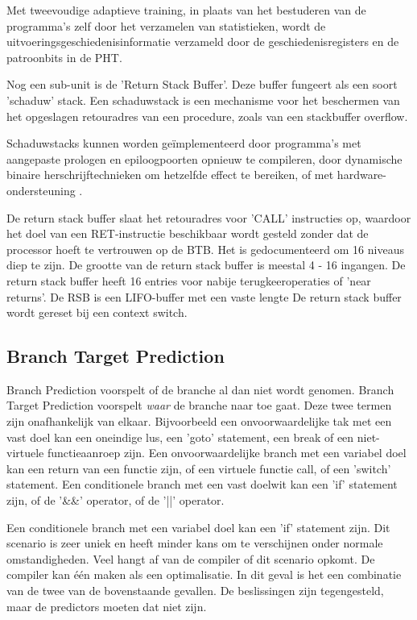 Met tweevoudige adaptieve training, in plaats van het bestuderen van de programma's zelf door het verzamelen van statistieken, wordt de uitvoeringsgeschiedenisinformatie verzameld door de geschiedenisregisters en de patroonbits in de PHT.

Nog een sub-unit is de 'Return Stack Buffer'. Deze buffer fungeert als een soort 'schaduw' stack.
Een schaduwstack is een mechanisme voor het beschermen van het opgeslagen retouradres van een procedure, zoals van een stackbuffer overflow.

Schaduwstacks kunnen worden geïmplementeerd door programma's met aangepaste prologen en epiloogpoorten opnieuw te compileren, door dynamische binaire herschrijftechnieken om hetzelfde effect te bereiken, of met hardware-ondersteuning \parencite{Sinnadurai2008}.

De return stack buffer slaat het retouradres voor 'CALL' instructies op, waardoor het doel van een RET-instructie beschikbaar wordt gesteld zonder dat de processor hoeft te vertrouwen op de BTB. Het is gedocumenteerd om 16 niveaus diep te zijn.
De grootte van de return stack buffer is meestal 4 - 16 ingangen.
De return stack buffer heeft 16 entries voor nabije terugkeeroperaties of 'near returns'.
De RSB is een LIFO-buffer met een vaste lengte
\parencite{Fog2018}
De return stack buffer wordt gereset bij een context switch.


\subsection{Branch Target Prediction}
Branch Prediction voorspelt of de branche al dan niet wordt genomen.
Branch Target Prediction voorspelt \emph{waar} de branche naar toe gaat.
Deze twee termen zijn onafhankelijk van elkaar.
Bijvoorbeeld een onvoorwaardelijke tak met een vast doel kan een oneindige lus, een 'goto' statement, een break of een niet-virtuele functieaanroep zijn.
Een onvoorwaardelijke branch met een variabel doel kan een return van een functie zijn, of een virtuele functie call, of een 'switch' statement.
Een conditionele branch met een vast doelwit kan een 'if' statement zijn, of de '\&\&' operator, of de '||' operator.

Een conditionele branch met een variabel doel kan een 'if' statement zijn.
Dit scenario is zeer uniek en heeft minder kans om te verschijnen onder normale omstandigheden.
Veel hangt af van de compiler of dit scenario opkomt.
De compiler kan één maken als een optimalisatie.
In dit geval is het een combinatie van de twee van de bovenstaande gevallen.
De beslissingen zijn tegengesteld, maar de predictors moeten dat niet zijn.


